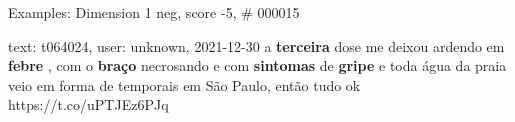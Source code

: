 \begin{frame}{Examples: Dimension 1 neg, score -5, \# 000015}
\footnotesize
\begin{alertblock}{text: t064024, user: unknown, 2021-12-30}
a \textbf{terceira} dose me deixou ardendo em \textbf{febre} , com o 
\textbf{braço} necrosando e com \textbf{sintomas} de \textbf{gripe} e toda água 
da praia veio em forma de temporais em São Paulo, então tudo ok 
https://t.co/uPTJEz6PJq 
\end{alertblock}
\end{frame}
